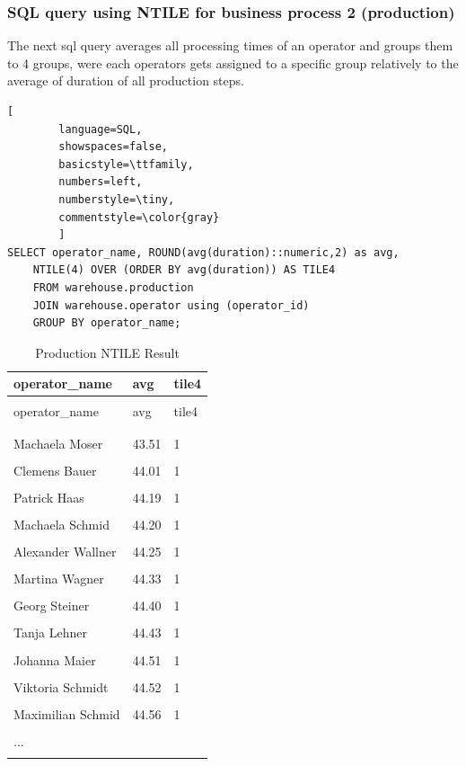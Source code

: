 \documentclass[letterpaper,12pt]{article}
\begin{document}
\subsubsection{SQL query using NTILE for business process 2 (production)}

The next sql query averages all processing times of an operator and groups them to 4 groups, were each operators gets assigned to a specific group relatively to the average of duration of all production steps.

\begin{lstlisting}[
        language=SQL,
        showspaces=false,
        basicstyle=\ttfamily,
        numbers=left,
        numberstyle=\tiny,
        commentstyle=\color{gray}
        ]
SELECT operator_name, ROUND(avg(duration)::numeric,2) as avg, 
	NTILE(4) OVER (ORDER BY avg(duration)) AS TILE4
	FROM warehouse.production
	JOIN warehouse.operator using (operator_id)
	GROUP BY operator_name;
\end{lstlisting}

\begingroup
\renewcommand\arraystretch{0.5}
\begin{longtable}{p{4cm}p{4cm}p{4cm}}
        \caption{Production NTILE Result} \\
				operator\_name & avg & tile4 \\
        \endfirsthead \\
        operator\_name & avg & tile4 \\
        \endhead \\
				\hline \\
Machaela Moser & 43.51 & 1 \\
\hline \\
Clemens Bauer & 44.01 & 1 \\
\hline \\
Patrick Haas & 44.19 & 1 \\
\hline \\
Machaela Schmid & 44.20 & 1 \\
\hline \\
Alexander Wallner & 44.25 & 1 \\
\hline \\
Martina Wagner & 44.33 & 1 \\
\hline \\
Georg Steiner & 44.40 & 1 \\
\hline \\
Tanja Lehner & 44.43 & 1 \\
\hline \\
Johanna Maier & 44.51 & 1 \\
\hline \\
Viktoria Schmidt & 44.52 & 1 \\
\hline \\
Maximilian Schmid & 44.56 & 1 \\
\hline \\
... & & \\
\hline \\
\end{longtable} 
\endgroup
\end{document}
